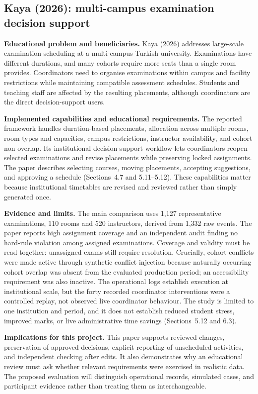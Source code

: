 \documentclass[
  11pt,a4paper,oneside]{report}
\begin{document}
\subsection{Kaya (2026): multi-campus examination decision support}
\textbf{Educational problem and beneficiaries.} Kaya (2026) addresses large-scale examination scheduling at a multi-campus Turkish university. Examinations have different durations, and many cohorts require more seats than a single room provides. Coordinators need to organise examinations within campus and facility restrictions while maintaining compatible assessment schedules. Students and teaching staff are affected by the resulting placements, although coordinators are the direct decision-support users.

\textbf{Implemented capabilities and educational requirements.} The reported framework handles duration-based placements, allocation across multiple rooms, room types and capacities, campus restrictions, instructor availability, and cohort non-overlap. Its institutional decision-support workflow lets coordinators reopen selected examinations and revise placements while preserving locked assignments. The paper describes selecting courses, moving placements, accepting suggestions, and approving a schedule (Sections~4.7 and 5.11--5.12). These capabilities matter because institutional timetables are revised and reviewed rather than simply generated once.

\textbf{Evidence and limits.} The main comparison uses 1,127 representative examinations, 110 rooms and 520 instructors, derived from 1,332 raw events. The paper reports high assignment coverage and an independent audit finding no hard-rule violation among assigned examinations. Coverage and validity must be read together: unassigned exams still require resolution. Crucially, cohort conflicts were made active through synthetic conflict injection because naturally occurring cohort overlap was absent from the evaluated production period; an accessibility requirement was also inactive. The operational logs establish execution at institutional scale, but the forty recorded coordinator interventions were a controlled replay, not observed live coordinator behaviour. The study is limited to one institution and period, and it does not establish reduced student stress, improved marks, or live administrative time savings (Sections~5.12 and 6.3).

\textbf{Implications for this project.} This paper supports reviewed changes, preservation of approved decisions, explicit reporting of unscheduled activities, and independent checking after edits. It also demonstrates why an educational review must ask whether relevant requirements were exercised in realistic data. The proposed evaluation will distinguish operational records, simulated cases, and participant evidence rather than treating them as interchangeable.
\end{document}
